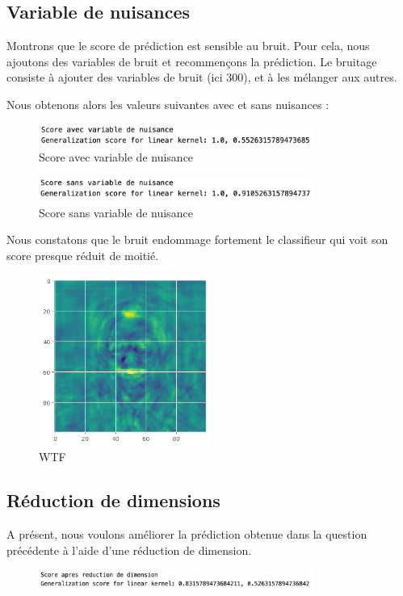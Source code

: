 \documentclass[a4paper,12pt]{article}
\begin{document}
\subsection{Variable de nuisances}

Montrons que le score de prédiction est sensible au bruit. Pour cela, nous ajoutons des variables de bruit et
recommençons la prédiction. Le bruitage consiste à ajouter des variables de bruit (ici 300), et à les mélanger aux autres. 

Nous obtenons alors les valeurs suivantes avec et sans nuisances :

\begin{figure}[H]
    \centering
    \includegraphics[width=0.8\textwidth]{Images/avec_variable.png}
    \caption{Score avec variable de nuisance}
    \label{fig: avec}
\end{figure}

\begin{figure}[H]
    \centering
    \includegraphics[width=0.8\textwidth]{Images/sans_variable.png}
    \caption{Score sans variable de nuisance}
    \label{fig: sans}
\end{figure}

Nous constatons que le bruit endommage fortement le classifieur qui voit son score presque réduit de moitié.

\begin{figure}[H]
    \centering
    \includegraphics[width=0.5\textwidth]{Images/coeff_visage.png}
    \caption{WTF}
    \label{fig:?}
\end{figure}

\subsection{Réduction de dimensions}

A présent, nous voulons améliorer la prédiction obtenue dans la question précédente à l'aide d'une réduction de
dimension.
\begin{figure}[H]
    \centering
    \includegraphics[width=0.8\textwidth]{Images/apres_reduction.png}
    \caption{}
    \label{fig:dim}
\end{figure}
\end{document}

